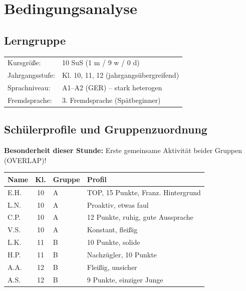 \documentclass[11pt,a4paper]{article}
\newcommand{\lerngruppengroesse}{10}
\newcommand{\maennlich}{1}
\newcommand{\weiblich}{9}
\newcommand{\divers}{0}
\newcommand{\gerniveau}{A1--A2}
\begin{document}
\section{Bedingungsanalyse}

\subsection{Lerngruppe}
\begin{tabular}{ll}
    Kursgröße: & \lerngruppengroesse{} SuS (\maennlich{} m / \weiblich{} w / \divers{} d) \\
    Jahrgangsstufe: & Kl. 10, 11, 12 (jahrgangsübergreifend) \\
    Sprachniveau: & \gerniveau{} (GER) -- stark heterogen \\
    Fremdsprache: & 3. Fremdsprache (Spätbeginner) \\
\end{tabular}

\subsection{Schülerprofile und Gruppenzuordnung}

\textbf{Besonderheit dieser Stunde:} Erste gemeinsame Aktivität beider Gruppen (OVERLAP)!

\vspace{0.5em}

\begin{tabular}{|l|c|l|p{5.5cm}|}
\hline
\textbf{Name} & \textbf{Kl.} & \textbf{Gruppe} & \textbf{Profil} \\
\hline
\textcolor{gruppeA}{E.H.} & 10 & \textcolor{gruppeA}{A} & TOP, 15 Punkte, Franz. Hintergrund \\
\hline
\textcolor{gruppeA}{L.N.} & 10 & \textcolor{gruppeA}{A} & Proaktiv, etwas faul \\
\hline
\textcolor{gruppeA}{C.P.} & 10 & \textcolor{gruppeA}{A} & 12 Punkte, ruhig, gute Aussprache \\
\hline
\textcolor{gruppeA}{V.S.} & 10 & \textcolor{gruppeA}{A} & Konstant, fleißig \\
\hline
\textcolor{gruppeB}{L.K.} & 11 & \textcolor{gruppeB}{B} & 10 Punkte, solide \\
\hline
\textcolor{gruppeB}{H.P.} & 11 & \textcolor{gruppeB}{B} & Nachzügler, 10 Punkte \\
\hline
\textcolor{gruppeB}{A.A.} & 12 & \textcolor{gruppeB}{B} & Fleißig, unsicher \\
\hline
\textcolor{gruppeB}{A.S.} & 12 & \textcolor{gruppeB}{B} & 9 Punkte, einziger Junge \\
\hline
\end{tabular}
\end{document}
